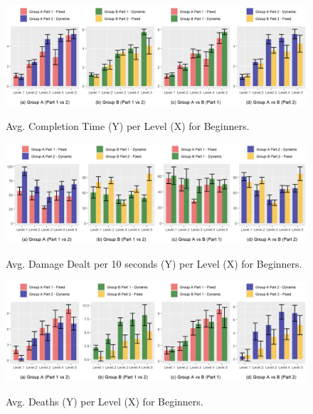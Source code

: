 \begin{figure}[!ht]
    \begin{center}
    \caption{Avg. Completion Time (Y) per Level (X) for Beginners.}
        \includegraphics[width=34em]{figures/completion_time-beginner_players.png}
        \label{fig:result-metric-beginners-completion-time}
    \end{center}
\end{figure}

\begin{figure}[!ht]
    \begin{center}
    \caption{Avg. Damage Dealt per 10 seconds (Y) per Level (X) for Beginners.}
        \includegraphics[width=34em]{figures/damage_dealt_per_10s-beginner_players.png}
        \label{fig:result-metric-beginners-damage-dealt-per-10s}
    \end{center}
\end{figure}

\begin{figure}[!ht]
    \begin{center}
    \caption{Avg. Deaths (Y) per Level (X) for Beginners.}
        \includegraphics[width=34em]{figures/deaths_per_level-beginner_players.png}
        \label{fig:result-metric-beginners-deaths-per-level}
    \end{center}
\end{figure}


